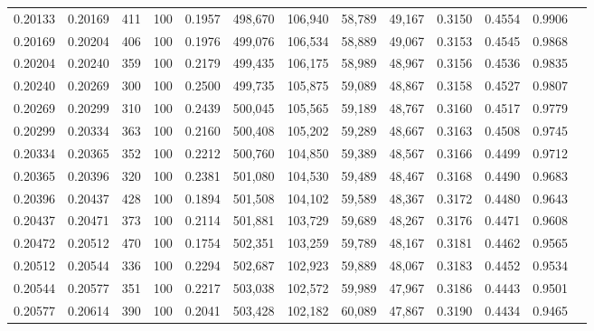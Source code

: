 \begin{tabular}{rrrrrrrrrrrrr}
0.20133 & 0.20169 &   411 & 100 &                                     0.1957 & 498,670 & 106,940 &  58,789 &  49,167 & 0.3150 & 0.4554 & 0.9906 \\
0.20169 & 0.20204 &   406 & 100 &                                     0.1976 & 499,076 & 106,534 &  58,889 &  49,067 & 0.3153 & 0.4545 & 0.9868 \\
0.20204 & 0.20240 &   359 & 100 &                                     0.2179 & 499,435 & 106,175 &  58,989 &  48,967 & 0.3156 & 0.4536 & 0.9835 \\
0.20240 & 0.20269 &   300 & 100 &                                     0.2500 & 499,735 & 105,875 &  59,089 &  48,867 & 0.3158 & 0.4527 & 0.9807 \\
0.20269 & 0.20299 &   310 & 100 &                                     0.2439 & 500,045 & 105,565 &  59,189 &  48,767 & 0.3160 & 0.4517 & 0.9779 \\
0.20299 & 0.20334 &   363 & 100 &                                     0.2160 & 500,408 & 105,202 &  59,289 &  48,667 & 0.3163 & 0.4508 & 0.9745 \\
0.20334 & 0.20365 &   352 & 100 &                                     0.2212 & 500,760 & 104,850 &  59,389 &  48,567 & 0.3166 & 0.4499 & 0.9712 \\
0.20365 & 0.20396 &   320 & 100 &                                     0.2381 & 501,080 & 104,530 &  59,489 &  48,467 & 0.3168 & 0.4490 & 0.9683 \\
0.20396 & 0.20437 &   428 & 100 &                                     0.1894 & 501,508 & 104,102 &  59,589 &  48,367 & 0.3172 & 0.4480 & 0.9643 \\
0.20437 & 0.20471 &   373 & 100 &                                     0.2114 & 501,881 & 103,729 &  59,689 &  48,267 & 0.3176 & 0.4471 & 0.9608 \\
0.20472 & 0.20512 &   470 & 100 &                                     0.1754 & 502,351 & 103,259 &  59,789 &  48,167 & 0.3181 & 0.4462 & 0.9565 \\
0.20512 & 0.20544 &   336 & 100 &                                     0.2294 & 502,687 & 102,923 &  59,889 &  48,067 & 0.3183 & 0.4452 & 0.9534 \\
0.20544 & 0.20577 &   351 & 100 &                                     0.2217 & 503,038 & 102,572 &  59,989 &  47,967 & 0.3186 & 0.4443 & 0.9501 \\
0.20577 & 0.20614 &   390 & 100 &                                     0.2041 & 503,428 & 102,182 &  60,089 &  47,867 & 0.3190 & 0.4434 & 0.9465 \\

\end{tabular}
